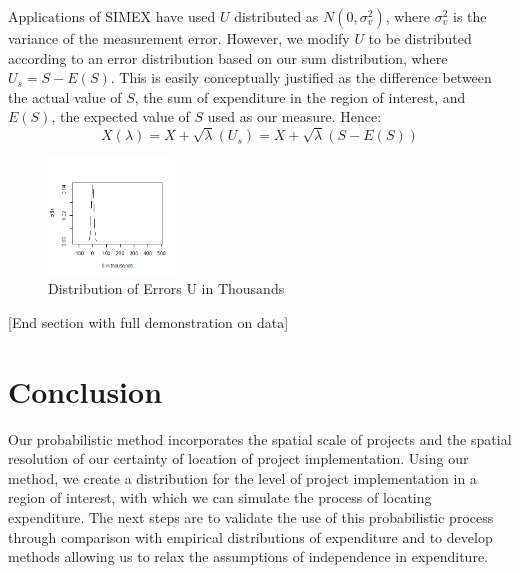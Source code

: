\documentclass[12pt]{article}
\begin{document}
Applications of SIMEX have used $U$ distributed as $N(0,\sigma_v^2)$, where $\sigma_v^2$ is the variance of the measurement error. However, we modify $U$ to be distributed according to an error distribution based on our sum distribution, where $U_s = S - E(S)$. This is easily conceptually justified as the difference between the actual value of $S$, the sum of expenditure in the region of interest, and $E(S)$, the expected value of $S$ used as our measure. Hence: 
\begin{equation}
X(\lambda)  = X + \sqrt{\lambda}(U_s) = X + \sqrt{\lambda}(S-E(S))
\end{equation}

\begin{figure}[!hbt]
\centering
\includegraphics[width=0.3\textwidth]{dist_u.png}
\caption{\label{fig:dist_u}Distribution of Errors U in Thousands}
\end{figure}

[End section with full demonstration on data]

\break
\section{Conclusion} \label{sec:conclusion}

Our probabilistic method incorporates the spatial scale of projects and the spatial resolution of our certainty of location of project implementation. Using our method, we create a distribution for the level of project implementation in a region of interest, with which we can simulate the process of locating expenditure. The next steps are to validate the use of this probabilistic process through comparison with empirical distributions of expenditure and to develop methods allowing us to relax the assumptions of independence in expenditure.




\end{document}
